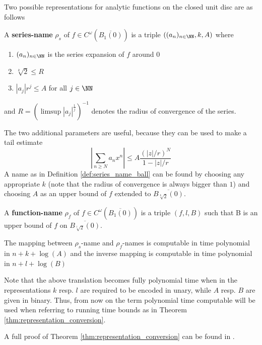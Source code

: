 	 Two possible representations for analytic functions on the closed unit disc are as follows
	 \begin{definition}\label{def:series_name_ball}
	 	A \textbf{series-name} $\rho_s$ of $f \in C^\omega(\overline{B_1(0)})$ is a triple $((a_n)_{n \in \NN}, k, A)$ where 
	 	\begin{enumerate}
	 		\item $(a_n)_{n \in \NN}$ is the series expansion of $f$ around $0$
	 		\item $\sqrt[k]{2} \leq R$ 
	 		\item $|a_j|r^j \leq A$ for all $j \in \NN$
	 	\end{enumerate}
	 	and $R = (\limsup |a_j|^{\frac{1}{j}})^{-1}$ denotes the radius of convergence of the series.
	 \end{definition}
	 The two additional parameters are useful, because they can be used to make a tail estimate 
	 \begin{equation}\label{eqn:tail_estimate}
	  \left | \sum_{n \geq N} a_nx^n \right | \leq A \frac{(|z|/r)^N}{1-|z|/r}
	 \end{equation}
	 A name as in Definition \ref{def:series_name_ball} can be found by choosing any appropriate $k$ (note that the radius of convergence is always bigger than $1$) and choosing $A$ as an upper bound of $f$ extended to $\overline{B_{\sqrt[k]{2}}(0)}$. 
	 \begin{definition}\label{def: function name ball}
	 	A \textbf{function-name} $\rho_f$ of $f \in C^\omega(\overline{B_1(0)})$ is a triple $(f, l, B)$ such that
		B is an upper bound of $f$ on $\overline{B_{\sqrt[l]{2}}(0)}$.
	 \end{definition}
	 \begin{theorem}\cite{Kawamura}\label{thm:representation_conversion}
	 	The mapping between $\rho_s$-name and $\rho_f$-names is computable in time polynomial in 
	 	$n+k+\log(A)$ and the inverse mapping is computable in time polynomial in $n+l+\log(B)$ 
	 \end{theorem}
	 Note that the above translation becomes fully polynomial time when in the representations $k$ resp. $l$ are required to be encoded in unary, while $A$ resp. $B$ are given in binary.
	 Thus, from now on the term polynomial time computable will be used when referring to running time bounds as in Theorem \ref{thm:representation_conversion}.

	 A full proof of Theorem \ref{thm:representation_conversion} can be found in \cite{Kawamura}. 

